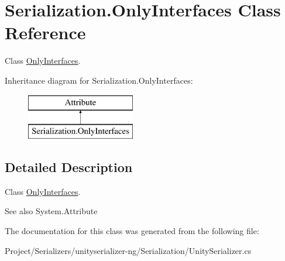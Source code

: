 \hypertarget{class_serialization_1_1_only_interfaces}{}\section{Serialization.\+Only\+Interfaces Class Reference}
\label{class_serialization_1_1_only_interfaces}


Class \hyperlink{class_serialization_1_1_only_interfaces}{Only\+Interfaces}.  


Inheritance diagram for Serialization.\+Only\+Interfaces\+:\begin{figure}[H]
\begin{center}
\leavevmode
\includegraphics[height=2.000000cm]{class_serialization_1_1_only_interfaces}
\end{center}
\end{figure}


\subsection{Detailed Description}
Class \hyperlink{class_serialization_1_1_only_interfaces}{Only\+Interfaces}. 

\begin{DoxySeeAlso}{See also}
System.\+Attribute


\end{DoxySeeAlso}


The documentation for this class was generated from the following file\+:\begin{DoxyCompactItemize}
\item 
Project/\+Serializers/unityserializer-\/ng/\+Serialization/Unity\+Serializer.\+cs\end{DoxyCompactItemize}
